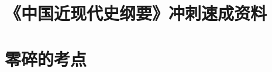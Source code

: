 \documentclass[10pt, UTF8]{book} %
\begin{document}









\chapter{《中国近现代史纲要》冲刺速成资料}

\chapter{零碎的考点}
\end{document}
